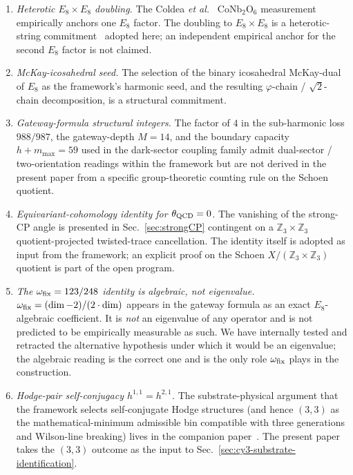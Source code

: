 ﻿\documentclass[reprint,amsmath,amssymb,aps,prd,longbibliography,floatfix]{revtex4-2}
\begin{document}
\begin{enumerate}
\item \emph{Heterotic $E_8 \times E_8$ doubling.} The Coldea
\textit{et al.}~\cite{Coldea2010} CoNb$_2$O$_6$ measurement empirically
anchors one $E_8$ factor. The doubling to $E_8 \times E_8$ is a
heterotic-string commitment~\cite{GHMR1985} adopted here; an
independent empirical anchor for the second $E_8$ factor is not
claimed.

\item \emph{McKay-icosahedral seed.} The selection of the binary
icosahedral McKay-dual of $E_8$ as the framework's harmonic seed,
and the resulting $\varphi$-chain / $\sqrt{2}$-chain decomposition,
is a structural commitment.

\item \emph{Gateway-formula structural integers.} The factor of $4$
in the sub-harmonic loss $988/987$, the gateway-depth $M=14$, and
the boundary capacity $h + m_{\max} = 59$ used in the dark-sector
coupling family admit dual-sector / two-orientation readings within
the framework but are not derived in the present paper from a
specific group-theoretic counting rule on the Schoen quotient.

\item \emph{Equivariant-cohomology identity for $\theta_{\rm QCD}=0$.}
The vanishing of the strong-CP angle is presented in
Sec.~\ref{sec:strongCP} contingent on a $\mathbb{Z}_3 \times
\mathbb{Z}_3$ quotient-projected twisted-trace cancellation. The
identity itself is adopted as input from the framework; an explicit
proof on the Schoen $X/(\mathbb{Z}_3 \times \mathbb{Z}_3)$ quotient
is part of the open program.

\item \emph{The $\omega_{\rm fix} = 123/248$ identity is algebraic,
not eigenvalue.} $\omega_{\rm fix} = (\dim - 2)/(2 \cdot \dim)$
appears in the gateway formula as an exact $E_8$-algebraic
coefficient. It is \emph{not} an eigenvalue of any operator and is
not predicted to be empirically measurable as such. We have
internally tested and retracted the alternative hypothesis under
which it would be an eigenvalue; the algebraic reading is the
correct one and is the only role $\omega_{\rm fix}$ plays in the
construction.

\item \emph{Hodge-pair self-conjugacy $h^{1,1} = h^{2,1}$.} The
substrate-physical argument that the framework selects
self-conjugate Hodge structures (and hence $(3,3)$ as the
mathematical-minimum admissible bin compatible with three
generations and Wilson-line breaking) lives in the companion
paper~\cite{UnreasonableEffectiveness}. The present paper takes the
$(3,3)$ outcome as the input to Sec.~\ref{sec:cy3-substrate-identification}.
\end{enumerate}
\end{document}
